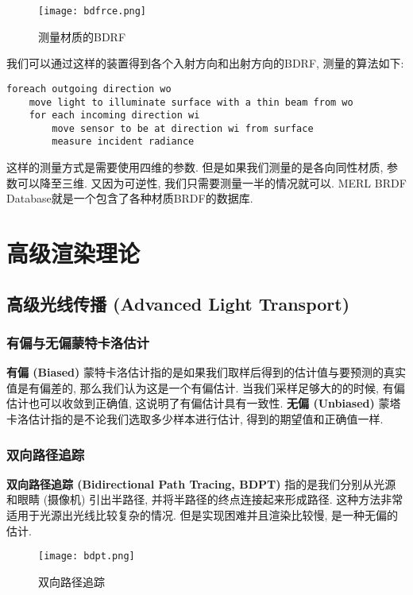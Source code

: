 \documentclass[openany]{progbookcn}
\begin{document}
\begin{figure}[H]
	\centering
	\texttt{[image: bdfrce.png]}
	\caption{测量材质的BDRF}
	\label{fig:bdrfce}
\end{figure}

我们可以通过这样的装置得到各个入射方向和出射方向的BDRF, 测量的算法如下: 
\begin{lstlisting}[caption=BDRF的测量]
foreach outgoing direction wo
	move light to illuminate surface with a thin beam from wo
	for each incoming direction wi
		move sensor to be at direction wi from surface
		measure incident radiance
\end{lstlisting}

这样的测量方式是需要使用四维的参数. 但是如果我们测量的是各向同性材质, 参数可以降至三维. 又因为可逆性, 我们只需要测量一半的情况就可以. MERL BRDF Database就是一个包含了各种材质BRDF的数据库. 

\chapter{高级渲染理论}

\section{高级光线传播 (Advanced Light Transport) }

\subsection{有偏与无偏蒙特卡洛估计}

\textbf{有偏 (Biased) }蒙特卡洛估计指的是如果我们取样后得到的估计值与要预测的真实值是有偏差的, 那么我们认为这是一个有偏估计. 当我们采样足够大的的时候, 有偏估计也可以收敛到正确值, 这说明了有偏估计具有一致性. \textbf{无偏 (Unbiased) }蒙塔卡洛估计指的是不论我们选取多少样本进行估计, 得到的期望值和正确值一样. 

\subsection{双向路径追踪}

\textbf{双向路径追踪 (Bidirectional Path Tracing, BDPT) }指的是我们分别从光源和眼睛 (摄像机) 引出半路径, 并将半路径的终点连接起来形成路径. 这种方法非常适用于光源出光线比较复杂的情况. 但是实现困难并且渲染比较慢, 是一种无偏的估计. 

\begin{figure}[H]
	\centering
	\texttt{[image: bdpt.png]}
	\caption{双向路径追踪}
	\label{fig:bdpt}
\end{figure}
\end{document}
